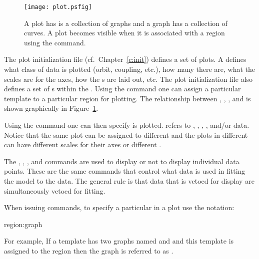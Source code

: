 \begin{figure}
  \centering
  \texttt{[image: plot.psfig]}
  \caption{A plot has is a collection of graphs and a graph has a 
collection of curves. A plot becomes visible when it 
is associated with a region using the  command.}
  \label{f:plot}
\end{figure}

The plot initialization file (cf.~Chapter~\ref{c:init}) defines a set
of  plots. A  defines what class of data is
plotted (orbit, coupling, etc.), how many  there are, what
the scales are for the  axes, how the s are laid
out, etc.  The plot initialization file also defines a set of
s within the .  Using the  command one
can assign a particular template to a particular region for plotting.
The relationship between , , , and
 is shown graphically in Figure~\ref{f:plot}.

Using the  command one can then specify  is
plotted.  refers to , , ,
, and/or  data.  Notice that the same 
plot can be assigned to different  and the plots in different
 can have different scales for their axes or different
.


The , , ,
and  commands are used to display or not to display
individual data points. These are the same commands that control what
data is used in fitting the model to the data. The general rule is
that data that is vetoed for display are simultaneously vetoed for fitting.

When issuing \tao commands, to specify a particular  in a plot
use the notation:
\begin{example}
  region:graph
\end{example}
For example, If a template has two graphs named  and  and
this template is assigned to the  region then the  graph
is referred to as . 

